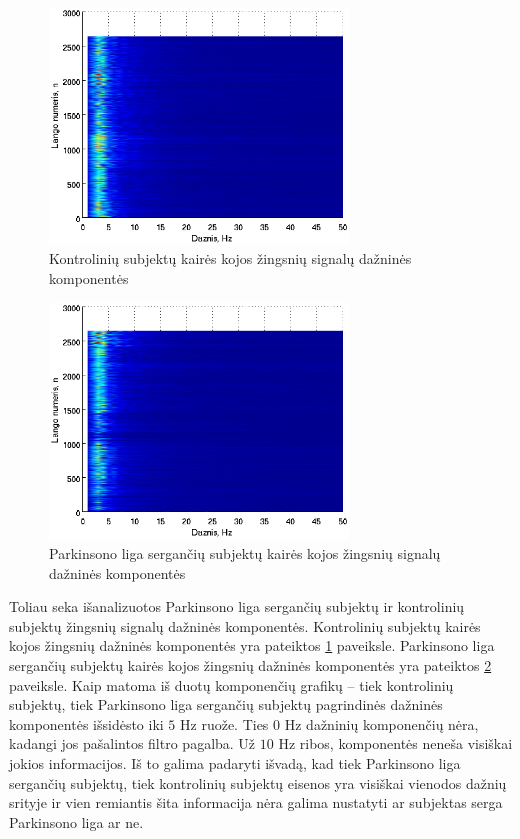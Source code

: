 \documentclass[]{vgtuef}
\begin{document}
\begin{figure}[!t]
  \centering
  \includegraphics[width=300px]{figures/co_fft.eps}
  \caption{Kontrolinių subjektų kairės kojos žingsnių signalų dažninės komponentės}
  \label{fig:co_fft}
\end{figure}

\begin{figure}[!t]
  \centering
  \includegraphics[width=300px]{figures/pt_fft.eps}
  \caption{Parkinsono liga sergančių subjektų kairės kojos žingsnių signalų dažninės komponentės}
  \label{fig:pt_fft}
\end{figure}


Toliau seka išanalizuotos Parkinsono liga sergančių subjektų ir kontrolinių subjektų žingsnių signalų dažninės komponentės. Kontrolinių subjektų kairės kojos žingsnių dažninės komponentės yra pateiktos \ref{fig:co_fft} paveiksle. Parkinsono liga sergančių subjektų kairės kojos žingsnių dažninės komponentės yra pateiktos \ref{fig:pt_fft} paveiksle. Kaip matoma iš duotų komponenčių grafikų -- tiek kontrolinių subjektų, tiek Parkinsono liga sergančių subjektų pagrindinės dažninės komponentės išsidėsto iki $5$ Hz ruože. Ties $0$ Hz dažninių komponenčių nėra, kadangi jos pašalintos filtro pagalba. Už $10$ Hz ribos, komponentės neneša visiškai jokios informacijos. Iš to galima padaryti išvadą, kad tiek Parkinsono liga sergančių subjektų, tiek kontrolinių subjektų eisenos yra visiškai vienodos dažnių srityje ir vien remiantis šita informacija nėra galima nustatyti ar subjektas serga Parkinsono liga ar ne.
\end{document}

